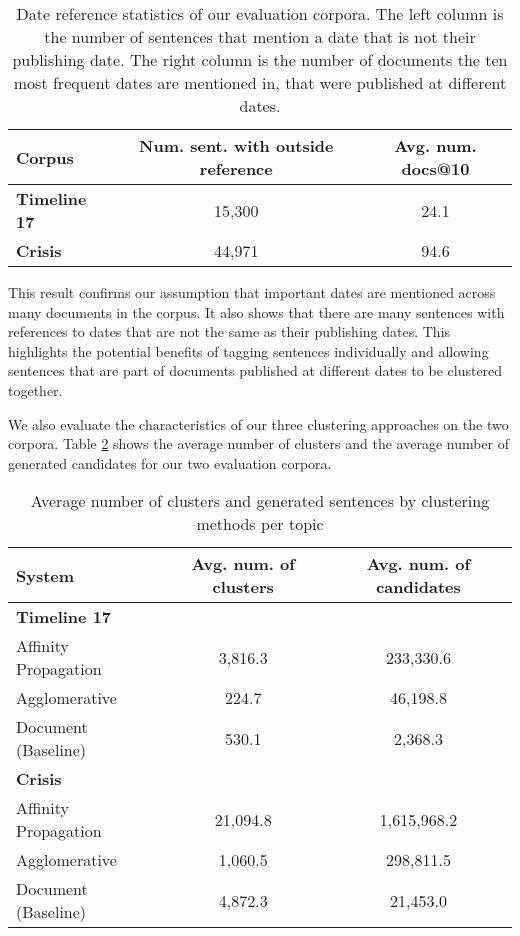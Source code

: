 \documentclass[a4paper,BCOR=10mm]{report}
\numberwithin{lemma}{chapter}
\numberwithin{definition}{chapter}
\begin{document}
\begin{table}
\begin{centering}
\begin{tabular}{|l|cc|}
\hline
Corpus & Num. sent. with outside reference & Avg. num. docs@10 \\\hline
\textbf{Timeline 17} & 15,300 & 24.1 \\
\textbf{Crisis} & 44,971 & 94.6 \\\hline
\end{tabular}
\end{centering}

\caption{Date reference statistics of our evaluation corpora. The left column is the number of sentences that mention a date that is not their publishing date. The right column is the number of documents the ten most frequent dates are mentioned in, that were published at different dates.}
\label{tab:datestats}
\end{table}

This result confirms our assumption that important dates are mentioned across many documents in the corpus. It also shows that there are many sentences with references to dates that are not the same as their publishing dates. This highlights the potential benefits of tagging sentences individually and allowing sentences that are part of documents published at different dates to be clustered together.

We also evaluate the characteristics of our three clustering approaches on the two corpora.
Table \ref{tab:genstats} shows the average number of clusters and the average number of generated candidates for our two evaluation corpora.

\begin{table}
\begin{centering}
\begin{tabular}{|l|cc|}
\hline
System & Avg. num. of clusters & Avg. num. of candidates \\\hline
\multicolumn{3}{|l|}{\textbf{Timeline 17}}\\\hline
Affinity Propagation & 3,816.3 & 233,330.6 \\
Agglomerative  & 224.7 & 46,198.8 \\
Document (Baseline) & 530.1 & 2,368.3 \\\hline
\multicolumn{3}{|l|}{\textbf{Crisis}}\\\hline
Affinity Propagation & 21,094.8 & 1,615,968.2 \\
Agglomerative & 1,060.5 & 298,811.5 \\
Document (Baseline) & 4,872.3 & 21,453.0 \\\hline
\end{tabular}
\end{centering}
\caption{Average number of clusters and generated sentences by clustering methods per topic}
\label{tab:genstats}
\end{table}
\end{document}
